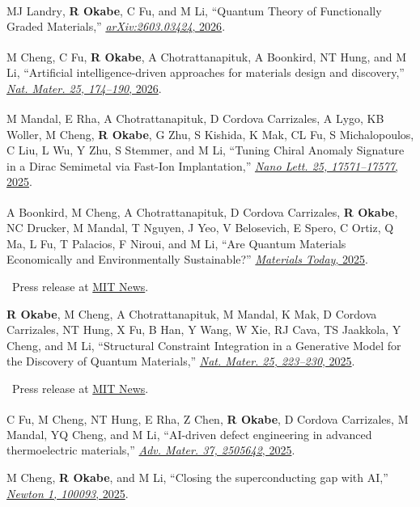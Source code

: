 \documentclass[10pt,a4paper]{article}
\newcommand{\note}[1]{\par{\hspace{1.2em}\textbullet\ #1}}
\newcommand{\cofirst}{\textsuperscript{\dag}}
\newcommand{\me}{\textbf{R Okabe}}
\begin{document}
\begin{cvenum}
  \item MJ Landry\cofirst, \me\cofirst, C Fu, and M Li, ``Quantum Theory of Functionally Graded Materials,'' \href{https://arxiv.org/abs/2603.03424}{\textit{arXiv:2603.03424}, 2026}.
  \item M Cheng\cofirst, C Fu\cofirst, \me\cofirst, A Chotrattanapituk\cofirst, A Boonkird, NT Hung, and M Li, ``Artificial intelligence-driven approaches for materials design and discovery,'' \href{https://doi.org/10.1038/s41563-025-02403-7}{\textit{Nat. Mater. 25, 174--190}, 2026}.
  \item M Mandal\cofirst, E Rha\cofirst, A Chotrattanapituk\cofirst, D Cordova Carrizales\cofirst, A Lygo, KB Woller, M Cheng, \me, G Zhu, S Kishida, K Mak, CL Fu, S Michalopoulos, C Liu, L Wu, Y Zhu, S Stemmer, and M Li, ``Tuning Chiral Anomaly Signature in a Dirac Semimetal via Fast-Ion Implantation,'' \href{https://doi.org/10.1021/acs.nanolett.5c03841}{\textit{Nano Lett. 25, 17571--17577}, 2025}.
  \item A Boonkird\cofirst, M Cheng\cofirst, A Chotrattanapituk\cofirst, D Cordova Carrizales, \me, NC Drucker, M Mandal, T Nguyen, J Yeo, V Belosevich, E Spero, C Ortiz, Q Ma, L Fu, T Palacios, F Niroui, and M Li, ``Are Quantum Materials Economically and Environmentally Sustainable?'' \href{https://doi.org/10.1016/j.mattod.2025.09.014}{\textit{Materials Today}, 2025}.
    \note{Press release at \href{https://news.mit.edu/2025/why-some-quantum-materials-stall-while-others-scale-1015}{MIT News}.}
  \item \me, M Cheng, A Chotrattanapituk, M Mandal, K Mak, D Cordova Carrizales, NT Hung, X Fu, B Han, Y Wang, W Xie, RJ Cava, TS Jaakkola, Y Cheng, and M Li, ``Structural Constraint Integration in a Generative Model for the Discovery of Quantum Materials,'' \href{https://doi.org/10.1038/s41563-025-02355-y}{\textit{Nat. Mater. 25, 223--230}, 2025}.
    \note{Press release at \href{https://news.mit.edu/2025/new-tool-makes-generative-ai-models-likely-create-breakthrough-materials-0922}{MIT News}.}
  \item C Fu\cofirst, M Cheng\cofirst, NT Hung\cofirst, E Rha, Z Chen, \me, D Cordova Carrizales, M Mandal, YQ Cheng, and M Li, ``AI-driven defect engineering in advanced thermoelectric materials,'' \href{https://doi.org/10.1002/adma.202505642}{\textit{Adv. Mater. 37, 2505642}, 2025}.
  \item M Cheng, \me, and M Li, ``Closing the superconducting gap with AI,'' \href{https://doi.org/10.1016/j.newton.2025.100093}{\textit{Newton 1, 100093}, 2025}.

\end{cvenum}
\end{document}
